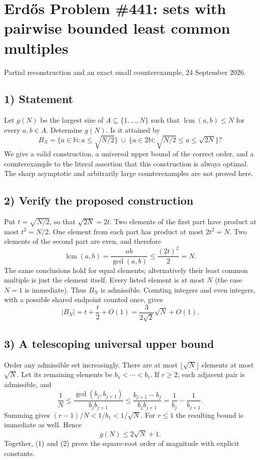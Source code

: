 \section{Erd\H{o}s Problem \#441: sets with pairwise bounded least common multiples}
\noindent Partial reconstruction and an exact small counterexample, 24 September 2026.

\subsection*{1) Statement}
Let $g(N)$ be the largest size of $A\subseteq\{1,\ldots,N\}$ such that $\operatorname{lcm}(a,b)\le N$ for every $a,b\in A$. Determine $g(N)$. Is it attained by
\[B_N=\{a\in\mathbb N:a\le\sqrt{N/2}\}
\ \cup\ \{a\in2\mathbb N:\sqrt{N/2}\le a\le\sqrt{2N}\}?\]
We give a valid construction, a universal upper bound of the correct order, and a counterexample to the literal assertion that this construction is always optimal. The sharp asymptotic and arbitrarily large counterexamples are not proved here.

\subsection*{2) Verify the proposed construction}
Put $t=\sqrt{N/2}$, so that $\sqrt{2N}=2t$. Two elements of the first part have product at most $t^2=N/2$. One element from each part has product at most $2t^2=N$. Two elements of the second part are even, and therefore
\[\operatorname{lcm}(a,b)=\frac{ab}{\gcd(a,b)}\le\frac{(2t)^2}{2}=N.\]
The same conclusions hold for equal elements; alternatively their least common multiple is just the element itself. Every listed element is at most $N$ (the case $N=1$ is immediate). Thus $B_N$ is admissible. Counting integers and even integers, with a possible shared endpoint counted once, gives
\[|B_N|=t+\frac t2+O(1)=\frac3{2\sqrt2}\sqrt N+O(1).\tag{1}\]

\subsection*{3) A telescoping universal upper bound}
Order any admissible set increasingly. There are at most $\lfloor\sqrt N\rfloor$ elements at most $\sqrt N$. Let its remaining elements be $b_1<\cdots<b_r$. If $r\ge2$, each adjacent pair is admissible, and
\[\frac1N\le\frac{\gcd(b_j,b_{j+1})}{b_jb_{j+1}}
\le\frac{b_{j+1}-b_j}{b_jb_{j+1}}
=\frac1{b_j}-\frac1{b_{j+1}}.\]
Summing gives $(r-1)/N<1/b_1<1/\sqrt N$. For $r\le1$ the resulting bound is immediate as well. Hence
\[g(N)\le2\sqrt N+1.\tag{2}\]
Together, (1) and (2) prove the square-root order of magnitude with explicit constants.

